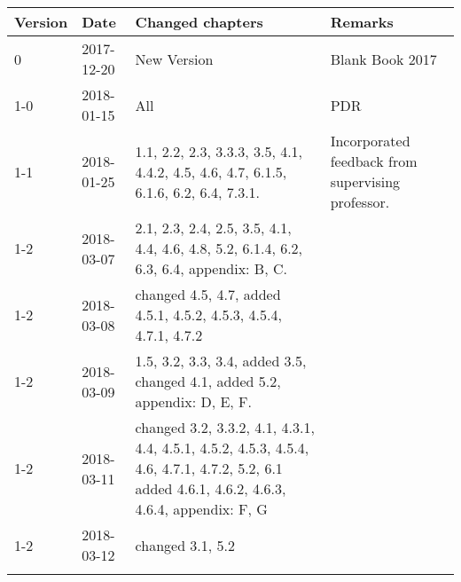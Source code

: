 \begin{longtable}{|p{}| p{} |p{} |p{}|}\hline
    \centering
    \textbf{Version}    & \textbf{Date}     & \textbf{Changed chapters} & \textbf{Remarks} \\\hline
    0       &   2017-12-20   & New Version   & Blank Book 2017  \\
    1-0     &   2018-01-15   & All           & PDR \\ 
    1-1     &   2018-01-25   & 1.1, 2.2, 2.3, 3.3.3, 3.5, 4.1, 4.4.2, 4.5, 4.6, 4.7, 6.1.5, 6.1.6, 6.2, 6.4, 7.3.1. & Incorporated feedback from supervising professor.\\ 
    1-2     &   2018-03-07   & 2.1, 2.3, 2.4, 2.5, 3.5, 4.1, 4.4, 4.6, 4.8, 5.2, 6.1.4, 6.2, 6.3, 6.4, appendix: B, C.     &    \\\hline 
    1-2     &   2018-03-08   & changed 4.5, 4.7, added 4.5.1, 4.5.2, 4.5.3, 4.5.4, 4.7.1, 4.7.2     &    \\\hline
    1-2     &   2018-03-09   & 1.5, 3.2, 3.3, 3.4, added 3.5, changed 4.1, added 5.2,  appendix: D, E, F.     & \\\hline 
    1-2     &   2018-03-11   & changed 3.2, 3.3.2, 4.1, 4.3.1, 4.4, 4.5.1, 4.5.2, 4.5.3, 4.5.4, 4.6, 4.7.1, 4.7.2, 5.2, 6.1 added 4.6.1, 4.6.2, 4.6.3, 4.6.4, appendix: F, G &    \\\hline 
    1-2     &   2018-03-12   & changed 3.1, 5.2 \\\hline 
   
    \label{COR}
\end{longtable}
